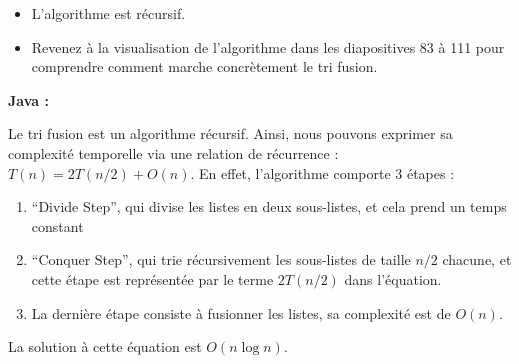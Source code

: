 \begin{Exercice} [20 minutes]
    \begin{conseil}
    \begin{itemize}
        \item L'algorithme est récursif. 
        \item Revenez à la visualisation de l'algorithme dans les diapositives 83 à 111 pour comprendre comment marche concrètement le tri fusion. 
    \end{itemize}
    
    \end{conseil}
    
     \begin{solution}
        \textbf{Java :}
        
    \end{solution}
    \begin{solution}
        
        
        Le tri fusion est un algorithme récursif. Ainsi, nous pouvons exprimer sa complexité temporelle via une relation de récurrence : $T(n) = 2T(n/2) + O(n)$. En effet, l'algorithme comporte 3 étapes :
        \begin{enumerate}
            \item ``Divide Step'', qui divise les listes en deux sous-listes, et cela prend un temps constant
            \item ``Conquer Step'', qui trie récursivement les sous-listes de taille $n/2$ chacune, et cette étape est représentée par le terme $2T(n/2)$ dans l'équation.
            \item La dernière étape consiste à fusionner les listes, sa complexité est de $O(n)$.
        \end{enumerate}
        La solution à cette équation est $O(n \log n)$.
    \end{solution}
\end{Exercice}





